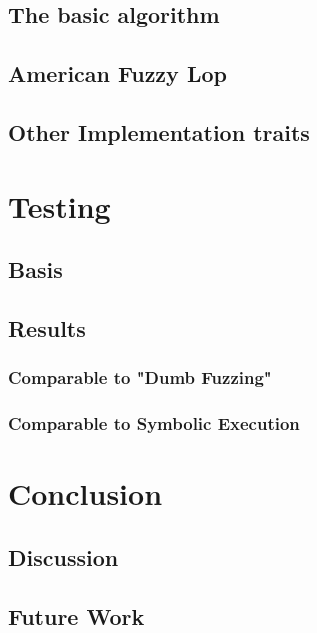 \documentclass[a4paper]{article}
\begin{document}
\subsection{The basic algorithm}
\subsection{American Fuzzy Lop}
\subsection{Other Implementation traits}

\section{Testing}
\subsection{Basis}
\subsection{Results}
\subsubsection*{Comparable to "Dumb Fuzzing"}
\subsubsection*{Comparable to Symbolic Execution}




\begin{comment}

Listinglabels
diffToFuzz
SymExExample
\end{comment}

\section{Conclusion}
\subsection{Discussion}
\subsection{Future Work}
\end{document}
